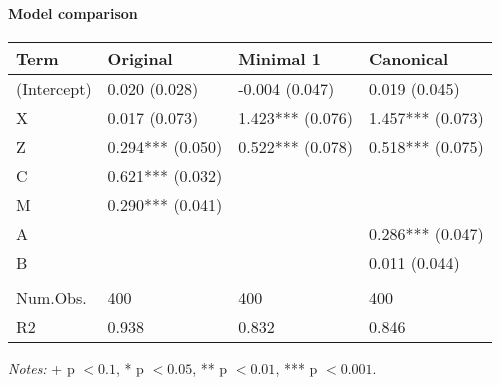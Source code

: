 \paragraph{Model comparison}
\begin{center}
\setlength{\LTleft}{0pt}\setlength{\LTright}{0pt}
\begin{longtable}{@{ }l l l l@{ }}
\toprule
Term & Original & Minimal 1 & Canonical \\
\midrule
{\textnormal{(Intercept)}} & {0.020 (0.028)} & {-0.004 (0.047)} & {0.019 (0.045)} \\
{\textnormal{X}} & {0.017 (0.073)} & {1.423*** (0.076)} & {1.457*** (0.073)} \\
{\textnormal{Z}} & {0.294*** (0.050)} & {0.522*** (0.078)} & {0.518*** (0.075)} \\
{\textnormal{C}} & {0.621*** (0.032)} &  &  \\
{\textnormal{M}} & {0.290*** (0.041)} &  &  \\
{\textnormal{A}} &  &  & {0.286*** (0.047)} \\
{\textnormal{B}} &  &  & {0.011 (0.044)} \\
 &  &  &  \\
{\textnormal{Num.Obs.}} & {400} & {400} & {400} \\
{\textnormal{R2}} & {0.938} & {0.832} & {0.846} \\
\bottomrule
\end{longtable}
\end{center}
{\footnotesize \emph{Notes:} + p $< 0.1$, * p $< 0.05$, ** p $< 0.01$, *** p $< 0.001$.}

\endgroup
